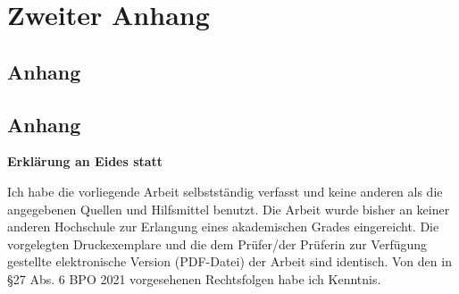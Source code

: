 \documentclass[11pt,a4paper,german,notitlepage]{report}
\begin{document}
\chapter{Zweiter Anhang}
\label{chap:anhang_2}

\section{Anhang}
\label{sec:anhang_2_1}

\section{Anhang}
\label{sec:anhang_2_2}

\clearpage

{}



\clearpage

%
%
%

\thispagestyle{empty}
\label{erklaerung}

\setlength{\parindent}{0em}

\textbf{\large{Erklärung an Eides statt}}

\vspace*{65pt}





Ich habe die vorliegende Arbeit selbstständig verfasst und keine anderen als die angegebenen Quellen und Hilfsmittel benutzt. Die Arbeit wurde bisher an keiner anderen Hochschule zur Erlangung eines akademischen Grades eingereicht. Die vorgelegten Druckexemplare und die dem Prüfer/der Prüferin zur Verfügung gestellte elektronische Version (PDF-Datei) der Arbeit sind identisch. Von den in §27 Abs. 6 BPO 2021 vorgesehenen Rechtsfolgen habe ich Kenntnis.
\end{document}
